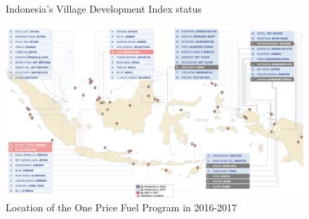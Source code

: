 \documentclass[letterpaper,12pt,leqno]{article}
\begin{document}
\begin{figure}[h!]
\hfill
{}
\caption{Indonesia's Village Development Index status}
\label{f:2}\end{figure}

\begin{landscape}
\begin{figure}[h!]
\includegraphics[scale=0.8]{Final_Project/image/BBM Satu Harga.png}
\caption{Location of the One Price Fuel Program in 2016-2017}
\label{f:3}
\end{figure}
\end{landscape}
 
\end{document}
